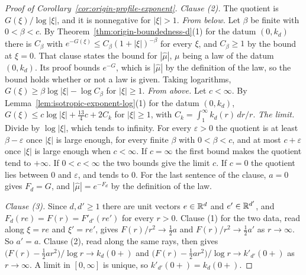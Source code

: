 \begin{proof}[Proof of Corollary~\ref{cor:origin-profile-exponent}]
\emph{Clause (2).} The quotient is $G(\xi)/\log|\xi|$, and it is nonnegative for $|\xi| > 1$.
\emph{From below.} Let $\beta$ be finite with $0 < \beta < c$. By Theorem~\ref{thm:origin-boundedness-d}(1)
for the datum $(0,k_d)$ there is $C_\beta$ with $e^{-G(\xi)} \le C_\beta(1+|\xi|)^{-\beta}$ for
every $\xi$, and $C_\beta \ge 1$ by the bound at $\xi = 0$. That clause states the bound for
$|\widehat\mu|$, $\mu$ being a law of the datum $(0,k_d)$. Its proof bounds $e^{-G}$, which is
$|\widehat\mu|$ by the definition of the law, so the bound holds whether or not a law is given.
Taking logarithms, $G(\xi) \ge \beta\log|\xi| - \log C_\beta$ for $|\xi| \ge 1$. \emph{From above.}
Let $c < \infty$. By Lemma~\ref{lem:isotropic-exponent-log}(1) for the datum $(0,k_d)$,
$G(\xi) \le c\log|\xi| + \tfrac{13}{4}c + 2C_k$ for $|\xi| \ge 1$, with
$C_k = \int_1^\infty k_d(r)\,dr/r$. \emph{The limit.} Divide by $\log|\xi|$, which tends to
infinity. For every $\varepsilon > 0$ the quotient is at least $\beta - \varepsilon$ once $|\xi|$ is
large enough, for every finite $\beta$ with $0 < \beta < c$, and at most $c + \varepsilon$ once
$|\xi|$ is large enough when $c < \infty$. If $c = \infty$ the first bound makes the quotient tend to
$+\infty$. If $0 < c < \infty$ the two bounds give the limit $c$. If $c = 0$ the quotient lies
between $0$ and $\varepsilon$, and tends to $0$. For the last sentence of the clause, $a = 0$ gives
$F_d = G$, and $|\widehat\mu| = e^{-F_d}$ by the definition of the law.

\emph{Clause (3).} Since $d, d' \ge 1$ there are unit vectors $e \in \mathbb{R}^d$ and $e' \in \mathbb{R}^{d'}$,
and $F_d(re) = F(r) = F'_{d'}(re')$ for every $r > 0$. Clause (1) for the two data, read along
$\xi = re$ and $\xi' = re'$, gives $F(r)/r^2 \to \tfrac12 a$ and $F(r)/r^2 \to \tfrac12 a'$ as
$r \to \infty$. So $a' = a$. Clause (2), read along the same rays, then gives
$\bigl(F(r) - \tfrac12 a r^2\bigr)/\log r \to k_d(0{+})$ and
$\bigl(F(r) - \tfrac12 a r^2\bigr)/\log r \to k'_{d'}(0{+})$ as $r \to \infty$. A limit in
$[0,\infty]$ is unique, so $k'_{d'}(0{+}) = k_d(0{+})$.
\end{proof}

